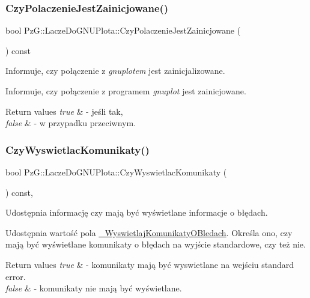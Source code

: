 \subsubsection{\texorpdfstring{CzyPolaczenieJestZainicjowane()}{CzyPolaczenieJestZainicjowane()}}
{\footnotesize\ttfamily bool Pz\+G\+::\+Lacze\+Do\+G\+N\+U\+Plota\+::\+Czy\+Polaczenie\+Jest\+Zainicjowane (\begin{DoxyParamCaption}{ }\end{DoxyParamCaption}) const}



Informuje, czy połączenie z {\itshape gnuplot\textquotesingle{}em} jest zainicjalizowane. 

Informuje, czy połączenie z programem {\itshape gnuplot} jest zainicjowane. 
\begin{DoxyRetVals}{Return values}
{\em true} & -\/ jeśli tak, \\
\hline
{\em false} & -\/ w przypadku przeciwnym. \\
\hline
\end{DoxyRetVals}
\mbox{\label{class_pz_g_1_1_lacze_do_g_n_u_plota_a5e4f3a226ed36f7110032d802d84847c}} 
\subsubsection{\texorpdfstring{CzyWyswietlacKomunikaty()}{CzyWyswietlacKomunikaty()}}
{\footnotesize\ttfamily bool Pz\+G\+::\+Lacze\+Do\+G\+N\+U\+Plota\+::\+Czy\+Wyswietlac\+Komunikaty (\begin{DoxyParamCaption}{ }\end{DoxyParamCaption}) const\hspace{0.3cm}{\ttfamily [inline]}, {\ttfamily [protected]}}



Udostępnia informację czy mają być wyświetlane informacje o błędach. 

Udostępnia wartość pola \mbox{\hyperlink{class_pz_g_1_1_lacze_do_g_n_u_plota_a2f2800f14ebfe1caef0b4d30c410a7fe}{\+\_\+\+Wyswietlaj\+Komunikaty\+O\+Bledach}}. Określa ono, czy mają być wyświetlane komunikaty o błędach na wyjście standardowe, czy też nie. 
\begin{DoxyRetVals}{Return values}
{\em true} & -\/ komunikaty mają być wyswietlane na wejściu {\ttfamily standard} {\ttfamily error}. \\
\hline
{\em false} & -\/ komunikaty nie mają być wyświetlane. \\
\hline
\end{DoxyRetVals}
\mbox{\label{class_pz_g_1_1_lacze_do_g_n_u_plota_aa815ce8ec16e12fc246cf422e562869e}} 
